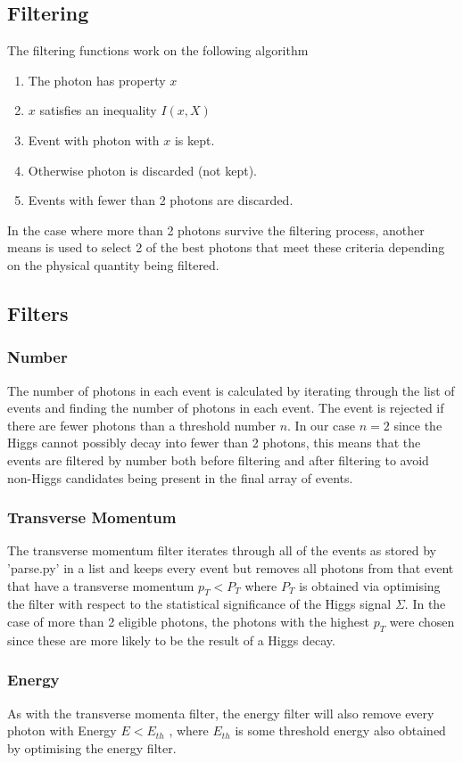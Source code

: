 \documentclass{article}
\begin{document}
\subsection{Filtering}
The filtering functions work on the following algorithm
\begin{enumerate}
\item The photon has property $x$
\item $x$ satisfies an inequality $I(x, X)$
\item Event with photon with $x$ is kept.
\item Otherwise photon is discarded (not kept).
\item Events with fewer than 2 photons are discarded.
\end{enumerate}
In the case where more than 2 photons survive the filtering process, another means is used to select 2 of the best photons that meet these criteria depending on the physical quantity being filtered.
\subsection{Filters}
\subsubsection{Number}
The number of photons in each event is calculated by iterating through the list of events and finding the number of photons in each event. The event is rejected if there are fewer photons than a threshold number $n$. In our case $n=2$ since the Higgs cannot possibly decay into fewer than 2 photons, this means that the events are filtered by number both before filtering and after filtering to avoid non-Higgs candidates being present in the final array of events. 
\subsubsection{Transverse Momentum}
The transverse momentum filter iterates through all of the events as stored by 'parse.py' in a list and keeps every event but removes all photons from that event that have a transverse momentum $p_T < P_T$ where $P_T$ is obtained via optimising the filter with respect to the statistical significance of the Higgs signal $\Sigma$. 
In the case of more than 2 eligible photons, the photons with the highest $p_T$ were chosen since these are more likely to be the result of a Higgs decay. 
\subsubsection{Energy}
As with the transverse momenta filter, the energy filter will also remove every photon with Energy $E< E_{th}$ , where $E_{th}$ is some threshold energy also obtained by optimising the energy filter. 
\end{document}
